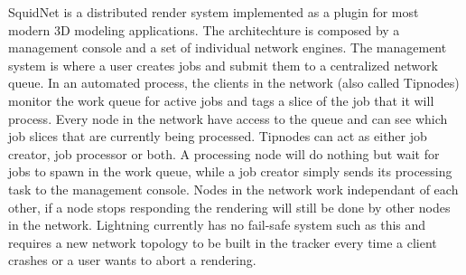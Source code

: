 
SquidNet is a distributed render system implemented as a plugin for most modern
3D modeling applications. The architechture is composed by a management console
and a set of individual network engines. The management system is where a user
creates jobs and submit them to a centralized network queue. In an automated
process, the clients in the network (also called Tipnodes) monitor the work
queue for active jobs and tags a slice of the job that it will process. Every
node in the network have access to the queue and can see which job slices that
are currently being processed. Tipnodes can act as either job creator, job
processor or both. A processing node will do nothing but wait for jobs to spawn
in the work queue, while a job creator simply sends its processing task to the
management console. Nodes in the network work independant of each other, if a
node stops responding the rendering will still be done by other nodes in the
network. Lightning currently has no fail-safe system such as this and requires a
new network topology to be built in the tracker every time a client crashes or a
user wants to abort a rendering.







